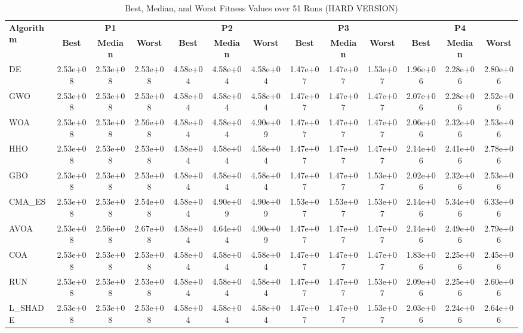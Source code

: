 \begin{table}
\centering
\caption{Best, Median, and Worst Fitness Values over 51 Runs (HARD VERSION)}
\label{tab:best_median_worst}
\tiny
\setlength{\tabcolsep}{2pt}
\begin{tabular}{lcccccccccccc}
\toprule
\multirow{2}{*}{\textbf{Algorithm}} & \multicolumn{3}{c}{\textbf{P1}} & \multicolumn{3}{c}{\textbf{P2}} & \multicolumn{3}{c}{\textbf{P3}} & \multicolumn{3}{c}{\textbf{P4}} \\
\cmidrule(lr){2-4}\cmidrule(lr){5-7}\cmidrule(lr){8-10}\cmidrule(lr){11-13}
 & \textbf{Best} & \textbf{Median} & \textbf{Worst} & \textbf{Best} & \textbf{Median} & \textbf{Worst} & \textbf{Best} & \textbf{Median} & \textbf{Worst} & \textbf{Best} & \textbf{Median} & \textbf{Worst} \\
\midrule
DE & 2.53e+08 & 2.53e+08 & 2.53e+08 & 4.58e+04 & 4.58e+04 & 4.58e+04 & 1.47e+07 & 1.47e+07 & 1.53e+07 & 1.96e+06 & 2.28e+06 & 2.80e+06 \\
GWO & 2.53e+08 & 2.53e+08 & 2.53e+08 & 4.58e+04 & 4.58e+04 & 4.58e+04 & 1.47e+07 & 1.47e+07 & 1.47e+07 & 2.07e+06 & 2.28e+06 & 2.52e+06 \\
WOA & 2.53e+08 & 2.53e+08 & 2.56e+08 & 4.58e+04 & 4.58e+04 & 4.90e+09 & 1.47e+07 & 1.47e+07 & 1.47e+07 & 2.06e+06 & 2.32e+06 & 2.53e+06 \\
HHO & 2.53e+08 & 2.53e+08 & 2.53e+08 & 4.58e+04 & 4.58e+04 & 4.58e+04 & 1.47e+07 & 1.47e+07 & 1.47e+07 & 2.14e+06 & 2.41e+06 & 2.78e+06 \\
GBO & 2.53e+08 & 2.53e+08 & 2.53e+08 & 4.58e+04 & 4.58e+04 & 4.58e+04 & 1.47e+07 & 1.47e+07 & 1.53e+07 & 2.02e+06 & 2.32e+06 & 2.53e+06 \\
CMA_ES & 2.53e+08 & 2.53e+08 & 2.54e+08 & 4.58e+04 & 4.90e+09 & 4.90e+09 & 1.53e+07 & 1.53e+07 & 1.53e+07 & 2.14e+06 & 5.34e+06 & 6.33e+06 \\
AVOA & 2.53e+08 & 2.56e+08 & 2.67e+08 & 4.58e+04 & 4.64e+04 & 4.90e+09 & 1.47e+07 & 1.47e+07 & 1.47e+07 & 2.14e+06 & 2.49e+06 & 2.79e+06 \\
COA & 2.53e+08 & 2.53e+08 & 2.53e+08 & 4.58e+04 & 4.58e+04 & 4.58e+04 & 1.47e+07 & 1.47e+07 & 1.47e+07 & 1.83e+06 & 2.25e+06 & 2.45e+06 \\
RUN & 2.53e+08 & 2.53e+08 & 2.53e+08 & 4.58e+04 & 4.58e+04 & 4.58e+04 & 1.47e+07 & 1.47e+07 & 1.53e+07 & 2.09e+06 & 2.25e+06 & 2.60e+06 \\
L_SHADE & 2.53e+08 & 2.53e+08 & 2.53e+08 & 4.58e+04 & 4.58e+04 & 4.58e+04 & 1.47e+07 & 1.47e+07 & 1.53e+07 & 2.03e+06 & 2.24e+06 & 2.64e+06 \\

\end{tabular}
\end{table}
